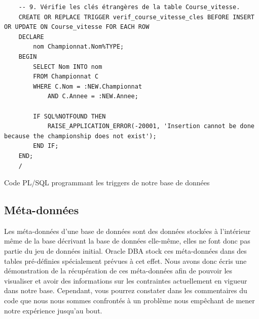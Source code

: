 \documentclass[12pt,a4paper]{article}
\newenvironment{code}{\captionsetup{type=listing}}{}
\begin{document}
\begin{code}
\begin{verbatim}
    -- 9. Vérifie les clés étrangères de la table Course_vitesse.
    CREATE OR REPLACE TRIGGER verif_course_vitesse_cles BEFORE INSERT OR UPDATE ON Course_vitesse FOR EACH ROW
    DECLARE
        nom Championnat.Nom%TYPE;
    BEGIN
        SELECT Nom INTO nom
        FROM Championnat C
        WHERE C.Nom = :NEW.Championnat
            AND C.Annee = :NEW.Annee;

        IF SQL%NOTFOUND THEN
            RAISE_APPLICATION_ERROR(-20001, 'Insertion cannot be done because the championship does not exist');
        END IF;
    END;
    /
    \end{verbatim}
    \caption{Code PL/SQL programmant les triggers de notre base de données}
    \label{lst.triggers}
\end{code}

\subsection{Méta-données}
\label{sub.metadata}

Les méta-données d'une base de données sont des données stockées à l’intérieur
même de la base décrivant la base de données elle-même, elles ne font donc pas
partie du jeu de données initial. Oracle DBA stock ces méta-données dans des
tables pré-définies spécialement prévues à cet effet. Nous avons donc écris une
démonstration de la récupération de ces méta-données afin de pouvoir les
visualiser et avoir des informations sur les contraintes actuellement en vigueur
dans notre base. Cependant, vous pourrez constater dans les commentaires du code
que nous nous sommes confrontés à un problème nous empêchant de mener notre
expérience jusqu’au bout.
\end{document}
